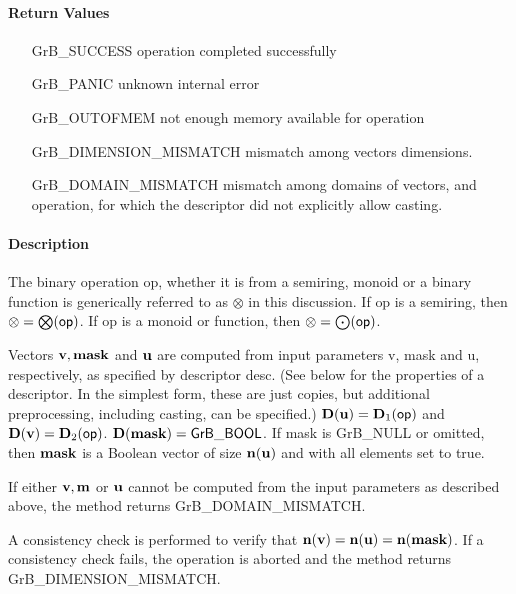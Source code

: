 \paragraph{Return Values}

\begin{itemize}[leftmargin=2.1in]
\item[{\sf GrB\_SUCCESS}]             operation completed successfully
\item[{\sf GrB\_PANIC}]               unknown internal error
\item[{\sf GrB\_OUTOFMEM}]            not enough memory available for operation
\item[{\sf GrB\_DIMENSION\_MISMATCH}] mismatch among vectors dimensions.
\item[{\sf GrB\_DOMAIN\_MISMATCH}]    mismatch among domains of vectors, and operation, for which the descriptor did not explicitly allow casting.
\end{itemize}

\paragraph{Description}

The binary operation {\sf op}, whether it is from a semiring, monoid or a binary function
is generically referred to as $\otimes$ in this discussion.
If {\sf op} is a semiring, then $\otimes = \bigotimes({\sf op})$. 
If {\sf op} is a monoid or function, then $\otimes = \bigodot({\sf op})$.

Vectors ${\bf v}, {\bf mask}$ and ${\bf u}$ are computed from
input parameters {\sf v}, {\sf mask} and {\sf u}, respectively, as specified
by descriptor {\sf desc}. (See below for the properties of a descriptor. In
the simplest form, these are just copies, but additional preprocessing,
including casting, can be specified.)  $\bold{D}({\bf u}) =
\bold{D}_1({\sf op})$ and $\bold{D}({\bf v}) = \bold{D}_2({\sf op})$.
$\bold{D}({\bf mask}) = {\sf GrB\_BOOL}$.  If {\sf mask} is {\sf GrB\_NULL} or omitted,
then ${\bf mask}$ is a Boolean vector of size $\bold{n}({\bf u})$
and with all elements set to {\sf true}.

If either ${\bf v}, {\bf m}$ or ${\bf u}$ cannot be computed
from the input parameters as described above, the method returns {\sf
GrB\_DOMAIN\_MISMATCH}.

A consistency check is performed to verify that $\bold{n}({\bf v})
= \bold{n}({\bf u}) = \bold{n}({\bf mask})$. If a consistency
check fails, the operation is aborted and the method returns {\sf
GrB\_DIMENSION\_MISMATCH}.

